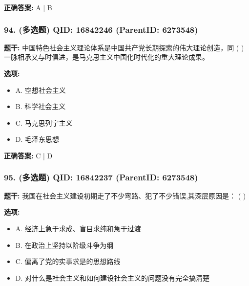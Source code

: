 \documentclass[12pt,UTF8]{ctexart}
\begin{document}
\textbf{正确答案:}
A | B

\vspace{0.3em}\hrulefill\vspace{0.7em}

\subsubsection*{94. (多选题) \small QID: 16842246 (ParentID: 6273548)}

\textbf{题干:}
中国特色社会主义理论体系是中国共产党长期探索的伟大理论创造，同 ( ) 一脉相承又与时俱进，是马克思主义中国化时代化的重大理论成果。



\textbf{选项:}
\begin{itemize}[leftmargin=*]

  \item A. 空想社会主义

  \item B. 科学社会主义

  \item C. 马克思列宁主义

  \item D. 毛泽东思想

\end{itemize}

\textbf{正确答案:}
C | D

\vspace{0.3em}\hrulefill\vspace{0.7em}

\subsubsection*{95. (多选题) \small QID: 16842237 (ParentID: 6273548)}

\textbf{题干:}
我国在社会主义建设初期走了不少弯路、犯了不少错误,其深层原因是： ( )



\textbf{选项:}
\begin{itemize}[leftmargin=*]

  \item A. 经济上急于求成、盲目求纯和急于过渡

  \item B. 在政治上坚持以阶级斗争为纲

  \item C. 偏离了党的实事求是的思想路线

  \item D. 对什么是社会主义和如何建设社会主义的问题没有完全搞清楚

\end{itemize}
\end{document}

